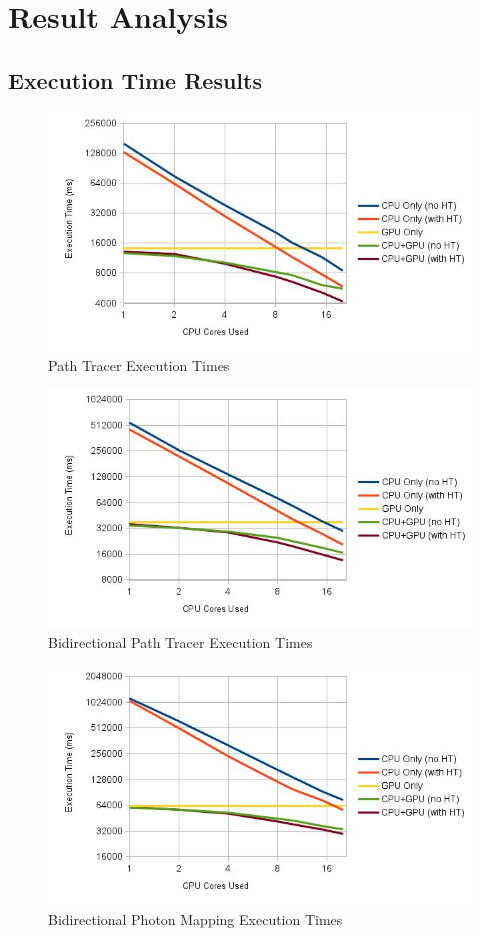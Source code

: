 \section{Result Analysis}

\subsection{\label{sec:texec}Execution Time Results}

\begin{figure}[H]
\centering
\includegraphics[width=0.8\linewidth]{img/ptTexec.jpg}
\caption{\label{img:ptTexec} Path Tracer Execution Times}
\end{figure}

\begin{figure}[H]
\centering
\includegraphics[width=0.8\linewidth]{img/bptTexec.jpg}
\caption{\label{img:bptTexec} Bidirectional Path Tracer Execution Times}
\end{figure}

\begin{figure}[H]
\centering
\includegraphics[width=0.8\linewidth]{img/bpmTexec.jpg}
\caption{\label{img:bpmTexec} Bidirectional Photon Mapping Execution Times}
\end{figure}

